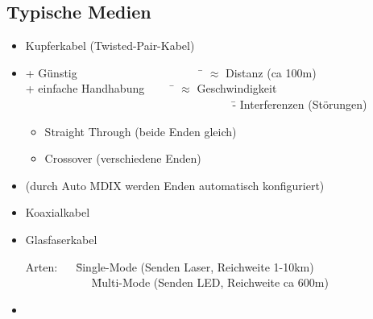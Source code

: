 \subsection*{Typische Medien}
\begin{itemize}
	\item Kupferkabel (Twisted-Pair-Kabel)
	\item[] \begin{tabbing}
		+ Günstig ~~~~~~~~~~~~~~~~~~~~~ \= $\approx$ Distanz (ca 100m) \\
		+ einfache Handhabung ~~~~ \= $\approx$ Geschwindigkeit \\
		~~~~~~~~~~~~~~~~~~~~~~~~~~~~~~~~~~~~ \= - Interferenzen (Störungen)
	\end{tabbing}
	\begin{itemize}
		\item Straight Through (beide Enden gleich)	
		\item Crossover (verschiedene Enden)
	\end{itemize}
	\item[] (durch Auto MDIX werden Enden automatisch konfiguriert)
	\item Koaxialkabel
	\item Glasfaserkabel
	\begin{tabbing}
		Arten: ~~ \= Single-Mode (Senden Laser, Reichweite 1-10km) \\
		~~~~~~~~~~~ \= Multi-Mode (Senden LED, Reichweite ca 600m)
	\end{tabbing}
	\item[] \begin{figure}[H]
		\centering
		\qquad

\end{figure}
\end{itemize}
